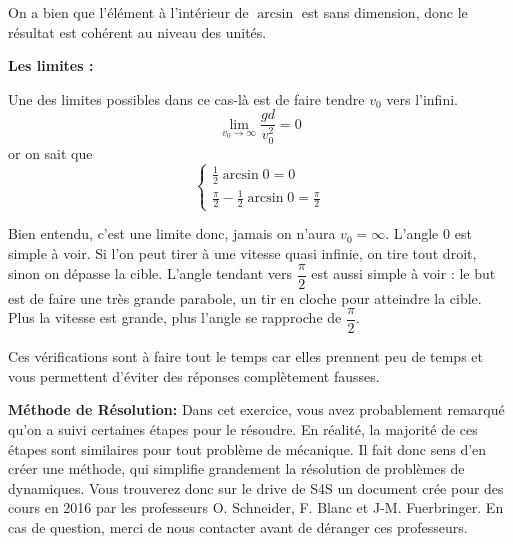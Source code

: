 \documentclass{article}
\begin{document}
    On a bien que l'élément à l'intérieur de $\arcsin$ est sans dimension, donc le résultat est cohérent au niveau des unités.
    \\\hfill
    
    \noindent\textbf{Les limites :}
    
    Une des limites possibles dans ce cas-là est de faire tendre $v_0$ vers l'infini.
    \[\lim_{v_0 \to \infty} \frac{gd}{v_{0}^2} =0\] or on sait que 
    \begin{equation*}
        \begin{cases}
          \frac{1}{2}\arcsin{0}=0\\
          \frac{\pi}{2}-\frac{1}{2}\arcsin{0}=\frac{\pi}{2} 
        \end{cases}
    \end{equation*}
    
  Bien entendu, c'est une limite donc, jamais on n'aura $v_0=\infty$. L'angle 0 est simple à voir. Si l'on peut tirer à une vitesse quasi infinie, on tire tout droit, sinon on dépasse la cible. L'angle tendant vers $\dfrac{\pi}{2}$ est aussi simple à voir : le but est de faire une très grande parabole, un tir en cloche pour atteindre la cible. Plus la vitesse est grande, plus l'angle se rapproche de $\dfrac{\pi}{2}$. 
  
  Ces vérifications sont à faire tout le temps car elles prennent peu de temps et vous permettent d'éviter des réponses complètement fausses. 
  
  \noindent\textbf{Méthode de Résolution:}
  Dans cet exercice, vous avez probablement remarqué qu'on a suivi certaines étapes pour le résoudre. En réalité, la majorité de ces étapes sont similaires pour tout problème de mécanique. Il fait donc sens d'en créer une méthode, qui simplifie grandement la résolution de problèmes de dynamiques. Vous trouverez donc sur le drive de S4S un document crée pour des cours en 2016 par les professeurs O. Schneider, F. Blanc et J-M. Fuerbringer. En cas de question, merci de nous contacter avant de déranger ces professeurs.
\end{document}
